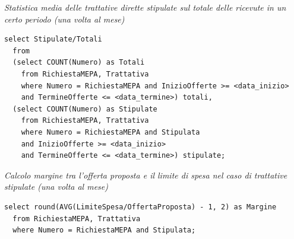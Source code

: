 \noindent{}
\newline\newline

\noindent\textit{Statistica media delle trattative dirette stipulate sul totale delle ricevute in un certo periodo (una volta al mese)}
\begin{verbatim}
select Stipulate/Totali
  from
  (select COUNT(Numero) as Totali
    from RichiestaMEPA, Trattativa
    where Numero = RichiestaMEPA and InizioOfferte >= <data_inizio>
    and TermineOfferte <= <data_termine>) totali,
  (select COUNT(Numero) as Stipulate
    from RichiestaMEPA, Trattativa
    where Numero = RichiestaMEPA and Stipulata
    and InizioOfferte >= <data_inizio>
    and TermineOfferte <= <data_termine>) stipulate;
\end{verbatim}
\vspace{0.5cm}

\noindent\textit{Calcolo margine tra l'offerta proposta e il limite di spesa nel caso di trattative stipulate (una volta al mese)}
\begin{verbatim}
select round(AVG(LimiteSpesa/OffertaProposta) - 1, 2) as Margine
  from RichiestaMEPA, Trattativa
  where Numero = RichiestaMEPA and Stipulata;
\end{verbatim}
\vspace{0.5cm}

\noindent{}
\newline\newline

